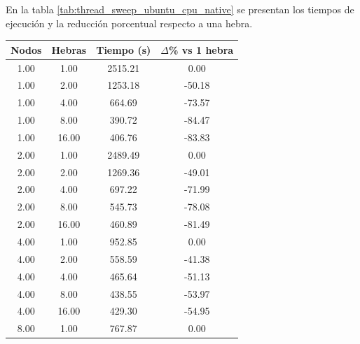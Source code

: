 En la tabla \ref{tab:thread_sweep_ubuntu_cpu_native} se presentan los tiempos de ejecución y la reducción porcentual respecto a una hebra.

\begin{table}[ht]
    \centering
    \begin{tabular}{|c|c|c|c|}
        \hline
        \textbf{Nodos} & \textbf{Hebras} & \textbf{Tiempo (s)} & \textbf{$\Delta$\% vs 1 hebra} \\
        \hline
        1.00           & 1.00            & 2515.21             & 0.00                           \\
        1.00           & 2.00            & 1253.18             & -50.18                         \\
        1.00           & 4.00            & 664.69              & -73.57                         \\
        1.00           & 8.00            & 390.72              & -84.47                         \\
        1.00           & 16.00           & 406.76              & -83.83                         \\
        2.00           & 1.00            & 2489.49             & 0.00                           \\
        2.00           & 2.00            & 1269.36             & -49.01                         \\
        2.00           & 4.00            & 697.22              & -71.99                         \\
        2.00           & 8.00            & 545.73              & -78.08                         \\
        2.00           & 16.00           & 460.89              & -81.49                         \\
        4.00           & 1.00            & 952.85              & 0.00                           \\
        4.00           & 2.00            & 558.59              & -41.38                         \\
        4.00           & 4.00            & 465.64              & -51.13                         \\
        4.00           & 8.00            & 438.55              & -53.97                         \\
        4.00           & 16.00           & 429.30              & -54.95                         \\
        8.00           & 1.00            & 767.87              & 0.00                           \\

\end{tabular}
\end{table}

